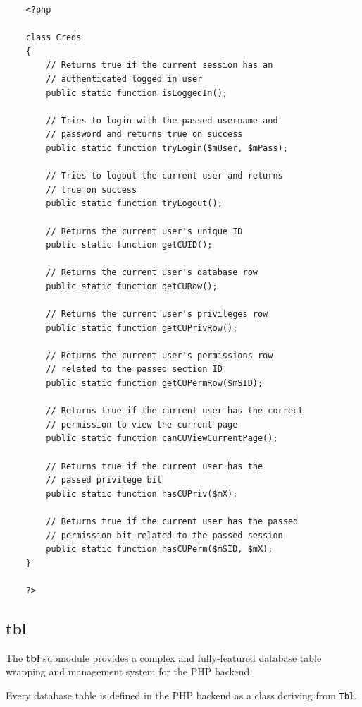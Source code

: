 \documentclass[12pt]{report}
\renewcommand\emph{\textbf}
\begin{document}
                    \begin{verbatim}
    <?php

    class Creds
    {
        // Returns true if the current session has an
        // authenticated logged in user
        public static function isLoggedIn();

        // Tries to login with the passed username and
        // password and returns true on success
        public static function tryLogin($mUser, $mPass);

        // Tries to logout the current user and returns
        // true on success
        public static function tryLogout();

        // Returns the current user's unique ID
        public static function getCUID();

        // Returns the current user's database row
        public static function getCURow();

        // Returns the current user's privileges row
        public static function getCUPrivRow();

        // Returns the current user's permissions row
        // related to the passed section ID
        public static function getCUPermRow($mSID);

        // Returns true if the current user has the correct
        // permission to view the current page
        public static function canCUViewCurrentPage();

        // Returns true if the current user has the 
        // passed privilege bit
        public static function hasCUPriv($mX);

        // Returns true if the current user has the passed
        // permission bit related to the passed session
        public static function hasCUPerm($mSID, $mX);
    }

    ?>                  
                \end{verbatim}

                \subsection{tbl}

                    The \emph{tbl} submodule provides a complex and fully-featured database table wrapping and management system for the PHP backend.

                    Every database table is defined in the PHP backend as a class deriving from \texttt{Tbl}. 
\end{document}
